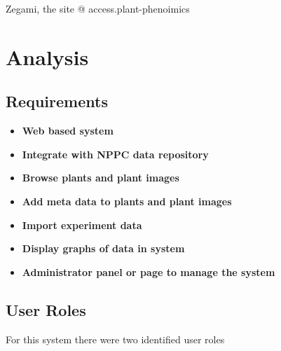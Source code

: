 Zegami, the site @ access.plant-phenoimics


\section{Analysis}


\subsection{Requirements}

\begin{itemize}
\item \textbf{Web based system}
\item \textbf{Integrate with NPPC data repository}
\item \textbf{Browse plants and plant images}
\item \textbf{Add meta data to plants and plant images}
\item \textbf{Import experiment data}
\item \textbf{Display graphs of data in system}
\item \textbf{Administrator panel or page to manage the system}
\end{itemize}







\subsection{User Roles}
For this system there were two identified user roles

